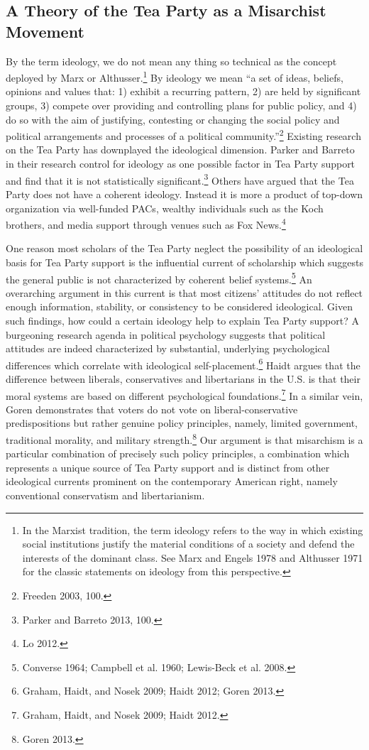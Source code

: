 \documentclass[12pt,]{article}
\begin{document}
\subsection{A Theory of the Tea Party as a Misarchist
Movement}\label{a-theory-of-the-tea-party-as-a-misarchist-movement}

By the term ideology, we do not mean any thing so technical as the
concept deployed by Marx or Althusser.\footnote{In the Marxist
  tradition, the term ideology refers to the way in which existing
  social institutions justify the material conditions of a society and
  defend the interests of the dominant class. See Marx
  and Engels 1978 and Althusser 1971 for the classic
  statements on ideology from this perspective.} By ideology we mean ``a
set of ideas, beliefs, opinions and values that: 1) exhibit a recurring
pattern, 2) are held by significant groups, 3) compete over providing
and controlling plans for public policy, and 4) do so with the aim of
justifying, contesting or changing the social policy and political
arrangements and processes of a political community.''\footnote{Freeden
  2003, 100. } Existing research on the Tea Party has downplayed the
ideological dimension. Parker and Barreto in their research control for
ideology as one possible factor in Tea Party support and find that it is
not statistically significant.\footnote{Parker and Barreto 2013, 100. }
Others have argued that the Tea Party does not have a coherent ideology.
Instead it is more a product of top-down organization via well-funded
PACs, wealthy individuals such as the Koch brothers, and media support
through venues such as Fox News.\footnote{Lo 2012. }

One reason most scholars of the Tea Party neglect the possibility of an
ideological basis for Tea Party support is the influential current of
scholarship which suggests the general public is not characterized by
coherent belief systems.\footnote{Converse 1964; Campbell et al. 1960;
  Lewis-Beck et al. 2008. } An overarching argument in this current is
that most citizens' attitudes do not reflect enough information,
stability, or consistency to be considered ideological. Given such
findings, how could a certain ideology help to explain Tea Party
support? A burgeoning research agenda in political psychology suggests
that political attitudes are indeed characterized by substantial,
underlying psychological differences which correlate with ideological
self-placement.\footnote{Graham, Haidt, and Nosek 2009; Haidt 2012;
  Goren 2013. } Haidt argues that the difference between liberals,
conservatives and libertarians in the U.S. is that their moral systems
are based on different psychological foundations.\footnote{Graham,
  Haidt, and Nosek 2009; Haidt 2012. } In a similar vein, Goren
demonstrates that voters do not vote on liberal-conservative
predispositions but rather genuine policy principles, namely, limited
government, traditional morality, and military strength.\footnote{Goren
  2013. } Our argument is that misarchism is a particular combination of
precisely such policy principles, a combination which represents a
unique source of Tea Party support and is distinct from other
ideological currents prominent on the contemporary American right,
namely conventional conservatism and libertarianism.
\end{document}
